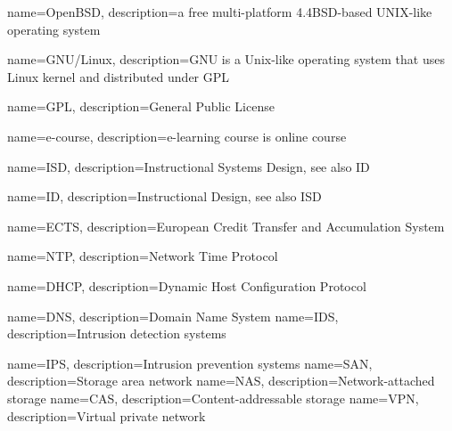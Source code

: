 {
  name=OpenBSD,
  description={a free multi-platform 4.4BSD-based UNIX-like operating system}
}

{
  name=GNU/Linux,
  description={GNU is a Unix-like operating system that uses Linux kernel and distributed under \gls{GPL}}
}


{
  name=GPL,
  description={General Public License}
}

{
  name=e-course,
  description={e-learning course is online course}
}

{
  name=ISD,
  description={Instructional Systems Design, see also \gls{ID}}
}

{
  name=ID,
  description={Instructional Design, see also \gls{ISD}}
}

{
  name=ECTS,
  description={European Credit Transfer and Accumulation System}
}

{
  name=NTP,
  description={Network Time Protocol}
}

{
  name=DHCP,
  description={Dynamic Host Configuration Protocol}
}

{
  name=DNS,
  description={Domain Name System}
}
{
  name=IDS,
  description={Intrusion detection systems}
}

{
  name=IPS,
  description={Intrusion prevention systems}
}
{
  name=SAN,
  description={Storage area network}
}
{
  name=NAS,
  description={Network-attached storage}
}
{
  name=CAS,
  description={Content-addressable storage}
}
{
  name=VPN,
  description={Virtual private network}
}
